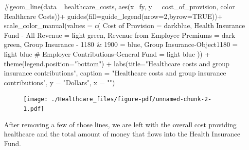 \documentclass[
  letterpaper,
  DIV=11,
  numbers=noendperiod]{scrreport}
\newenvironment{Shaded}{\begin{snugshade}}{\end{snugshade}}
\newcommand{\AttributeTok}[1]{\textcolor[rgb]{0.40,0.45,0.13}{#1}}
\newcommand{\CommentTok}[1]{\textcolor[rgb]{0.37,0.37,0.37}{#1}}
\newcommand{\ConstantTok}[1]{\textcolor[rgb]{0.56,0.35,0.01}{#1}}
\newcommand{\DecValTok}[1]{\textcolor[rgb]{0.68,0.00,0.00}{#1}}
\newcommand{\FunctionTok}[1]{\textcolor[rgb]{0.28,0.35,0.67}{#1}}
\newcommand{\NormalTok}[1]{\textcolor[rgb]{0.00,0.23,0.31}{#1}}
\newcommand{\OtherTok}[1]{\textcolor[rgb]{0.00,0.23,0.31}{#1}}
\newcommand{\SpecialCharTok}[1]{\textcolor[rgb]{0.37,0.37,0.37}{#1}}
\newcommand{\StringTok}[1]{\textcolor[rgb]{0.13,0.47,0.30}{#1}}
\begin{document}
\begin{Shaded}
\begin{Highlighting}[]
  \CommentTok{\#geom\_line(data= healthcare\_costs, aes(x=fy, y = cost\_of\_provision, color = \textquotesingle{}Healthcare Costs\textquotesingle{}))+ }
\FunctionTok{guides}\NormalTok{(}\AttributeTok{fill=}\FunctionTok{guide\_legend}\NormalTok{(}\AttributeTok{nrow=}\DecValTok{2}\NormalTok{,}\AttributeTok{byrow=}\ConstantTok{TRUE}\NormalTok{))}\SpecialCharTok{+}
  \FunctionTok{scale\_color\_manual}\NormalTok{(}\AttributeTok{values =} \FunctionTok{c}\NormalTok{(}
    \StringTok{\textquotesingle{}Cost of Provision\textquotesingle{}} \OtherTok{=} \StringTok{\textquotesingle{}darkblue\textquotesingle{}}\NormalTok{,}
    \StringTok{\textquotesingle{}Health Insurance Fund {-} All Revenue\textquotesingle{}} \OtherTok{=} \StringTok{\textquotesingle{}light green\textquotesingle{}}\NormalTok{,}
    \StringTok{\textquotesingle{}Revenue from Employee Premiums\textquotesingle{}} \OtherTok{=} \StringTok{\textquotesingle{}dark green\textquotesingle{}}\NormalTok{,}
    \StringTok{\textquotesingle{}Group Insurance {-} 1180 \& 1900\textquotesingle{}} \OtherTok{=} \StringTok{\textquotesingle{}blue\textquotesingle{}}\NormalTok{,}
    \StringTok{\textquotesingle{}Group Insurance{-}Object1180\textquotesingle{}} \OtherTok{=} \StringTok{\textquotesingle{}light blue\textquotesingle{}}
   \CommentTok{\#     \textquotesingle{}Employer Contributions{-}General Fund\textquotesingle{} = \textquotesingle{}light blue\textquotesingle{}}
\NormalTok{)) }\SpecialCharTok{+}
  \FunctionTok{theme}\NormalTok{(}\AttributeTok{legend.position=}\StringTok{"bottom"}\NormalTok{) }\SpecialCharTok{+}
  \FunctionTok{labs}\NormalTok{(}\AttributeTok{title=}\StringTok{"Healthcare costs and group insurance contributions"}\NormalTok{, }
       \AttributeTok{caption =} \StringTok{"Healthcare costs and group insurance contributions"}\NormalTok{, }
       \AttributeTok{y =} \StringTok{"Dollars"}\NormalTok{, }\AttributeTok{x =} \StringTok{""}\NormalTok{)}
\end{Highlighting}
\end{Shaded}

\begin{figure}[H]

{\centering \texttt{[image: ./Healthcare\_files/figure-pdf/unnamed-chunk-2-1.pdf]}

}

\end{figure}

After removing a few of those lines, we are left with the overall cost
providing healthcare and the total amount of money that flows into the
Health Insurance Fund.
\end{document}
